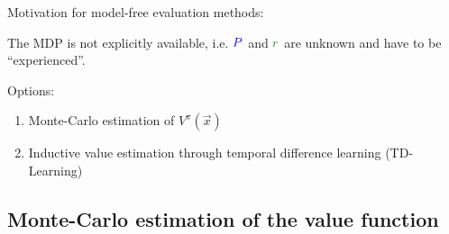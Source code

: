 \begin{frame}\frametitle{\secname}

Motivation for model-free evaluation methods:\\

\svspace{5mm}

The MDP is not explicitly available, i.e. ${\color{trans}P}$ and ${\color{reward}r}$ are unknown and have to be ``experienced''.\\

\svspace{5mm}

Options:
\begin{enumerate}[A]
\item Monte-Carlo estimation of $V^\pi(\vec x)$
\item Inductive value estimation through temporal difference learning (TD-Learning)
\end{enumerate}

\end{frame}

\subsection{Monte-Carlo estimation of the value function}

